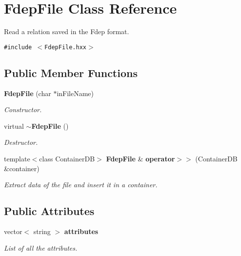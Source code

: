 \section{Fdep\-File Class Reference}
\label{class_fdep_file}
Read a relation saved in the Fdep format.  


{\tt \#include $<$Fdep\-File.hxx$>$}

\subsection*{Public Member Functions}
\begin{CompactItemize}
\item 
{\bf Fdep\-File} (char $\ast$in\-File\-Name)\label{class_fdep_file_56ef78c6ca2658e52a2e07d985d41b23}

\begin{CompactList}\small\item\em Constructor. \item\end{CompactList}\item 
virtual {\bf $\sim$Fdep\-File} ()
\begin{CompactList}\small\item\em Destructor. \item\end{CompactList}\item 
template$<$class Container\-DB$>$ {\bf Fdep\-File} \& {\bf operator$>$$>$} (Container\-DB \&container)
\begin{CompactList}\small\item\em Extract data of the file and insert it in a container. \item\end{CompactList}\end{CompactItemize}
\subsection*{Public Attributes}
\begin{CompactItemize}
\item 
vector$<$ string $>$ {\bf attributes}\label{class_fdep_file_2a716ed1ecb7dfc8897266aa00a8ce69}

\begin{CompactList}\small\item\em List of all the attributes. \item\end{CompactList}\end{CompactItemize}
